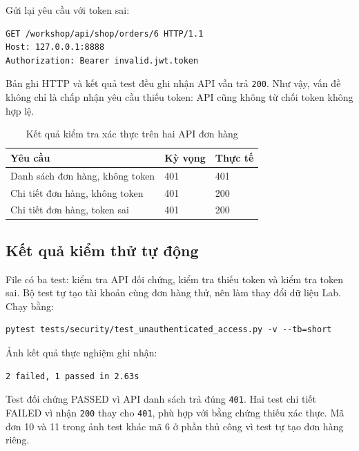 \documentclass[oneside,a4paper,12pt]{extreport}
\begin{document}
Gửi lại yêu cầu với token sai:
\begin{Verbatim}[breaklines=true,breakanywhere=true,fontsize=\small]
GET /workshop/api/shop/orders/6 HTTP/1.1
Host: 127.0.0.1:8888
Authorization: Bearer invalid.jwt.token
\end{Verbatim}

Bản ghi HTTP và kết quả test đều ghi nhận API vẫn trả \texttt{200}.
Như vậy, vấn đề không chỉ là chấp nhận yêu cầu thiếu token: API cũng
không từ chối token không hợp lệ.

\begin{table}[htbp]
\centering
\caption{Kết quả kiểm tra xác thực trên hai API đơn hàng}
\label{tab:unauthenticated-result}
\begin{tabularx}{\textwidth}{@{} X l l @{}}
\toprule
\textbf{Yêu cầu} & \textbf{Kỳ vọng} & \textbf{Thực tế} \\
\midrule
Danh sách đơn hàng, không token & 401 & 401 \\
Chi tiết đơn hàng, không token & 401 & 200 \\
Chi tiết đơn hàng, token sai & 401 & 200 \\
\bottomrule
\end{tabularx}
\end{table}

\clearpage
\subsection{Kết quả kiểm thử tự động}

File  có ba test:
kiểm tra API đối chứng, kiểm tra thiếu token và kiểm tra token sai.
Bộ test tự tạo tài khoản cùng đơn hàng thử, nên làm thay đổi dữ liệu
Lab. Chạy bằng:
\begin{Verbatim}[breaklines=true,breakanywhere=true,fontsize=\small]
pytest tests/security/test_unauthenticated_access.py -v --tb=short
\end{Verbatim}

Ảnh kết quả thực nghiệm ghi nhận:
\begin{Verbatim}[breaklines=true,breakanywhere=true,fontsize=\small]
2 failed, 1 passed in 2.63s
\end{Verbatim}

Test đối chứng PASSED vì API danh sách trả đúng \texttt{401}. Hai test
chi tiết FAILED vì nhận \texttt{200} thay cho \texttt{401}, phù hợp
với bằng chứng thiếu xác thực. Mã đơn 10 và 11 trong ảnh test khác mã
6 ở phần thủ công vì test tự tạo đơn hàng riêng.
\end{document}
